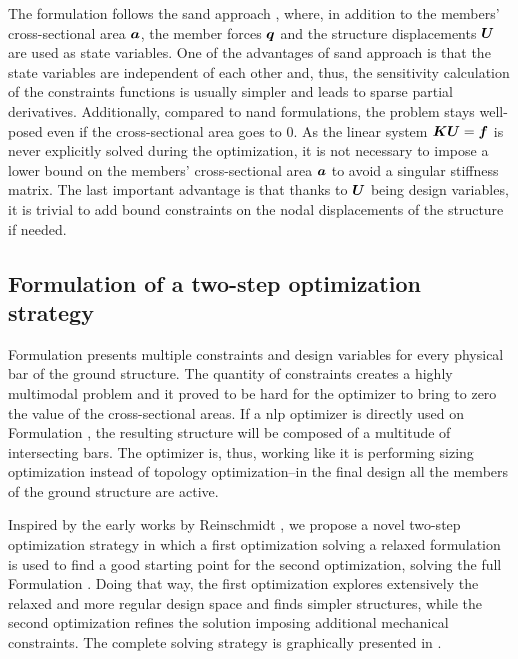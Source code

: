 The formulation follows the \gls{sand} approach , where, in addition to the members' cross-sectional area $\bm{a}$, the member forces $\bm{q}$ and the structure displacements $\bm{U}$ are used as state variables. One of the advantages of \gls{sand} approach is that the state variables are independent of each other and, thus, the sensitivity calculation of the constraints functions is usually simpler and leads to sparse partial derivatives. Additionally, compared to \gls{nand} formulations, the problem stays well-posed even if the cross-sectional area goes to 0. As the linear system $\bm{K}\bm{U}=\bm{f}$ is never explicitly solved during the optimization, it is not necessary to impose a lower bound on the members' cross-sectional area $\bm{a}$ to avoid a singular stiffness matrix. The last important advantage is that thanks to $\bm{U}$ being design variables, it is trivial to add bound constraints on the nodal displacements of the structure if needed.

\subsection{Formulation of a two-step optimization strategy} \label{sec:04_2step_opt}
Formulation  presents multiple constraints and design variables for every physical bar of the ground structure. The quantity of constraints creates a highly multimodal problem and it proved to be hard for the optimizer to bring to zero the value of the cross-sectional areas. If a \gls{nlp} optimizer is directly used on Formulation , the resulting structure will be composed of a multitude of intersecting bars. The optimizer is, thus, working like it is performing sizing optimization instead of topology optimization--\ie in the final design all the members of the ground structure are active. 

Inspired by the early works by Reinschmidt , we propose a novel two-step optimization strategy in which a first optimization solving a relaxed formulation is used to find a good starting point for the second optimization, solving the full Formulation . Doing that way, the first optimization explores extensively the relaxed and more regular design space and finds simpler structures, while the second optimization refines the solution imposing additional mechanical constraints. The complete solving strategy is graphically presented in .

